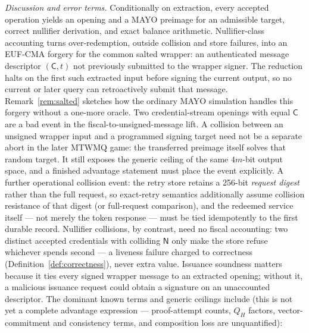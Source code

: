 \documentclass[11pt]{article}
\newcommand{\Cred}{\mathsf{C}}
\newcommand{\Null}{\mathsf{N}}
\begin{document}
\noindent\emph{Discussion and error terms.}
Conditionally on extraction, every accepted operation yields an opening
and a MAYO preimage for an admissible target, correct nullifier
derivation, and exact balance arithmetic.  Nullifier-class accounting turns
over-redemption, outside collision and store failures, into an EUF-CMA
forgery for the common salted wrapper: an authenticated message descriptor
$(\Cred,t)$ not previously submitted to the wrapper signer. The reduction
halts on the first such extracted input before signing the current output, so
no current or later query can retroactively submit that message. Remark~\ref{rem:salted}
sketches how the ordinary MAYO simulation handles this forgery without a
one-more oracle. Two credential-stream openings with equal $\Cred$ are a bad
event in the fiscal-to-unsigned-message lift. A collision between an unsigned
wrapper input and a programmed signing target need not be a separate abort in
the later MTWMQ game: the transferred preimage itself solves that random
target. It still exposes the generic ceiling of the same $4m$-bit output
space, and a finished advantage statement must place the event explicitly.
A further operational collision event: the
retry store retains a 256-bit \emph{request digest} rather than the full
request, so exact-retry semantics additionally assume collision
resistance of that digest (or full-request comparison), and the redeemed
service itself --- not merely the token response --- must be tied
idempotently to the first durable record. Nullifier collisions, by
contrast, need no fiscal accounting: two distinct accepted credentials
with colliding $\Null$ only make the store refuse whichever spends
second --- a liveness failure charged to correctness
(Definition~\ref{def:correctness}), never extra value. Issuance soundness
matters because it ties every signed wrapper message to an extracted opening;
without it, a malicious issuance request could obtain a signature on an
unaccounted descriptor. The dominant known terms and generic ceilings
include (this is not yet a complete advantage expression --- proof-attempt
counts, $Q_H$ factors, vector-commitment and consistency terms, and
composition loss are unquantified):
\end{document}
